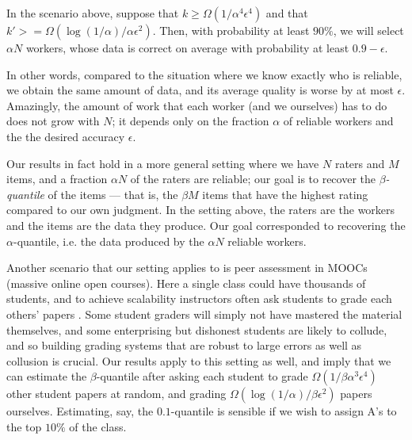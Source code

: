 \begin{theorem}
\label{thm:intro}
In the scenario above, suppose that $k \geq \Omega(1/\alpha^4\epsilon^4)$
and that $k' >= \Omega(\log(1/\alpha)/\alpha\epsilon^2)$. Then, with probability 
at least $90\%$, we will select $\alpha N$ workers, whose data is correct on 
average with probability at least $0.9-\epsilon$.
\end{theorem}
In other words, compared to the situation where we know exactly who is reliable, 
we obtain the same amount of data, and its average quality is worse by at most 
$\epsilon$. Amazingly, the amount of work that each worker (and we ourselves) has 
to do does not grow with $N$; it depends only on the fraction $\alpha$ of 
reliable workers and the the desired accuracy $\epsilon$.

Our results in fact hold in a more general setting where we have $N$ raters and 
$M$ items, and a fraction $\alpha N$ of the raters are reliable; our goal is to 
recover the \emph{$\beta$-quantile} of the items --- that is, the $\beta M$ items 
that have the highest rating compared to our own judgment. In the setting above, 
the raters are the workers and the items are the data they produce. Our goal 
corresponded to recovering the $\alpha$-quantile, i.e. the data produced by the 
$\alpha N$ reliable workers.

Another scenario that our setting applies to is peer assessment in MOOCs (massive 
online open courses). Here a single class could have thousands of students, 
and to achieve scalability instructors often ask students to grade each others' 
papers \citep{kulkarni2015peer,piech2013tuned}. 
Some student graders will simply not have mastered the material themselves, 
and some enterprising but dishonest students are likely to collude, and 
so building grading systems that are robust to large errors as well as 
collusion is crucial. 
Our results apply to this setting as well, and imply that we can estimate the 
$\beta$-quantile after asking each student to grade 
$\Omega(1/\beta\alpha^3\epsilon^4)$ other student papers at random, and 
grading $\Omega(\log(1/\alpha)/\beta\epsilon^2)$ papers ourselves.
Estimating, say, the $0.1$-quantile is 
sensible if we wish to assign A's to the top $10\%$ of the class. 

